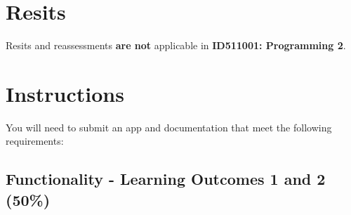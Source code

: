 \documentclass{article}
\begin{document}
\section*{Resits}
Resits and reassessments \textbf{are not} applicable in \textbf{ID511001: Programming 2}.

\section*{Instructions}
You will need to submit an app and documentation that meet the following requirements:\\

\subsection*{Functionality - Learning Outcomes 1 and 2 (50\%)}
\end{document}
